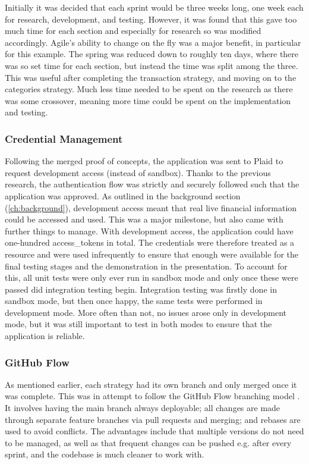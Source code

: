 Initially it was decided that each sprint would be three weeks long, one week each for research, development, and testing. However, it was found that this gave too much time for each section and especially for research so was modified accordingly. Agile's ability to change on the fly was a major benefit, in particular for this example. The spring was reduced down to roughly ten days, where there was so set time for each section, but instead the time was split among the three. This was useful after completing the transaction strategy, and moving on to the categories strategy. Much less time needed to be spent on the research as there was some crossover, meaning more time could be spent on the implementation and testing.

\subsubsection{Credential Management}
Following the merged proof of concepts, the application was sent to Plaid to request development access (instead of sandbox). Thanks to the previous research, the authentication flow was strictly and securely followed such that the application was approved. As outlined in the background section (\ref{ch:background}), development access meant that real live financial information could be accessed and used. This was a major milestone, but also came with further things to manage. With development access, the application could have one-hundred access\_tokens in total. The credentials were therefore treated as a resource and were used infrequently to ensure that enough were available for the final testing stages and the demonstration in the presentation. To account for this, all unit tests were only ever run in sandbox mode and only once these were passed did integration testing begin. Integration testing was firstly done in sandbox mode, but then once happy, the same tests were performed in development mode. More often than not, no issues arose only in development mode, but it was still important to test in both modes to ensure that the application is reliable. 


\subsubsection{GitHub Flow}
As mentioned earlier, each strategy had its own branch and only merged once it was complete. This was in attempt to follow the GitHub Flow branching model \cite{GitHubFlow}. It involves having the main branch always deployable; all changes are made through separate feature branches via pull requests and merging; and rebases are used to avoid conflicts. The advantages include that multiple versions do not need to be managed, as well as that frequent changes can be pushed e.g. after every sprint, and the codebase is much cleaner to work with.

